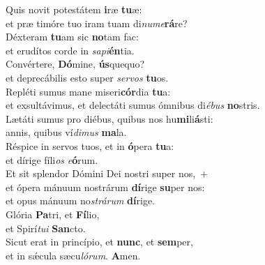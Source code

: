 \oddverse Quis novit potestátem \textbf{i}ræ \textbf{tu}æ:~\*\\
\oddverse et præ timóre tuo iram tuam di\textit{nu}\textit{me}\textbf{rá}re?\\
\evenverse Déxteram \textbf{tu}am sic \textbf{no}tam fac:~\*\\
\evenverse et erudítos corde in \textit{sa}\textit{pi}\textbf{én}tia.\\
\oddverse Convértere, \textbf{Dó}mine, \textbf{ús}quequo?~\*\\
\oddverse et deprecábilis esto super \textit{ser}\textit{vos} \textbf{tu}os.\\
\evenverse Repléti sumus mane miseri\textbf{cór}dia \textbf{tu}a:~\*\\
\evenverse et exsultávimus, et delectáti sumus ómnibus di\textit{é}\textit{bus} \textbf{no}stris.\\
\oddverse Lætáti sumus pro diébus, quibus nos hu\textbf{mi}li\textbf{á}sti:~\*\\
\oddverse annis, quibus ví\textit{di}\textit{mus} \textbf{ma}la.\\
\evenverse Réspice in servos tuos, et in \textbf{ó}pera \textbf{tu}a:~\*\\
\evenverse et dírige fíli\textit{os} \textit{e}\textbf{ó}rum.\\
\oddverse Et sit splendor Dómini Dei nostri super nos,~+\\
\oddverse  et ópera mánuum nostrárum \textbf{dí}rige \textbf{su}per nos:~\*\\
\oddverse et opus mánuum no\textit{strá}\textit{rum} \textbf{dí}rige.\\
\evenverse Glória \textbf{Pa}tri, et \textbf{Fí}lio,~\*\\
\evenverse et Spirí\textit{tu}\textit{i} \textbf{San}cto.\\
\oddverse Sicut erat in princípio, et \textbf{nunc}, et \textbf{sem}per,~\*\\
\oddverse et in sǽcula sæcu\textit{ló}\textit{rum}. \textbf{A}men.\\
